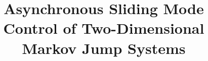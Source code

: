 \documentclass[journal,final,twocolumn]{IEEEtran}
\begin{document}
%
\title{Asynchronous Sliding Mode Control of Two-Dimensional Markov Jump Systems}




% 
\end{document}
